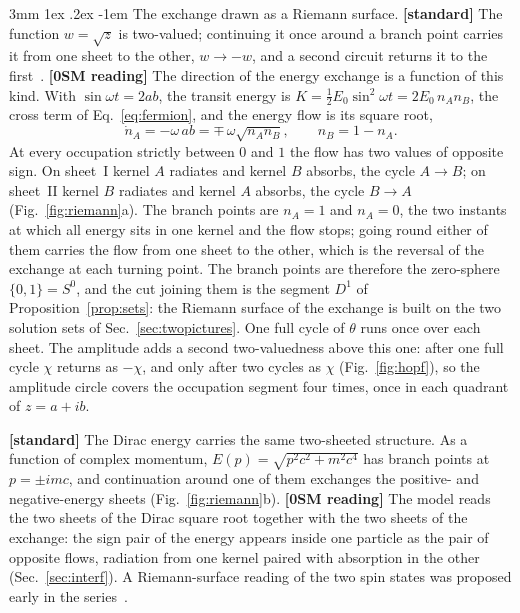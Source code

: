 \documentclass[%
 reprint, amsmath,amssymb, aps, prb, ]{revtex4-2}
\makeatletter
\numberwithin{equation}{section}
\renewcommand\paragraph{%
  \@startsection{paragraph}{4}{\z@}%
    {3mm \@plus 1ex \@minus .2ex}%
    {-1em}%
    {\normalfont\normalsize\itshape}}
\makeatother
\begin{document}
\paragraph{The exchange drawn as a Riemann surface.} \textbf{[standard]} The function $w=\sqrt{z}$ is two-valued; continuing it once around a branch point carries it from one sheet to the other, $w\to-w$, and a second circuit returns it to the first~\cite{ref:needham}. \textbf{[0SM reading]} The direction of the energy exchange is a function of this kind. With $\sin\omega t=2ab$, the transit energy is $K=\tfrac12E_0\sin^2\omega t=2E_0\,n_An_B$, the cross term of Eq.~\eqref{eq:fermion}, and the energy flow is its square root,
\begin{equation}
\dot n_A=-\omega\,ab=\mp\,\omega\sqrt{n_An_B},\qquad n_B=1-n_A .
\label{eq:flowroot}
\end{equation}
At every occupation strictly between $0$ and $1$ the flow has two values of opposite sign. On sheet~I kernel $A$ radiates and kernel $B$ absorbs, the cycle $A\to B$; on sheet~II kernel $B$ radiates and kernel $A$ absorbs, the cycle $B\to A$ (Fig.~\ref{fig:riemann}a). The branch points are $n_A=1$ and $n_A=0$, the two instants at which all energy sits in one kernel and the flow stops; going round either of them carries the flow from one sheet to the other, which is the reversal of the exchange at each turning point. The branch points are therefore the zero-sphere $\{0,1\}=S^0$, and the cut joining them is the segment $D^1$ of Proposition~\ref{prop:sets}: the Riemann surface of the exchange is built on the two solution sets of Sec.~\ref{sec:twopictures}. One full cycle of $\theta$ runs once over each sheet. The amplitude adds a second two-valuedness above this one: after one full cycle $\chi$ returns as $-\chi$, and only after two cycles as $\chi$ (Fig.~\ref{fig:hopf}), so the amplitude circle covers the occupation segment four times, once in each quadrant of $z=a+ib$.

\textbf{[standard]} The Dirac energy carries the same two-sheeted structure. As a function of complex momentum, $E(p)=\sqrt{p^2c^2+m^2c^4}$ has branch points at $p=\pm imc$, and continuation around one of them exchanges the positive- and negative-energy sheets (Fig.~\ref{fig:riemann}b). \textbf{[0SM reading]} The model reads the two sheets of the Dirac square root together with the two sheets of the exchange: the sign pair of the energy appears inside one particle as the pair of opposite flows, radiation from one kernel paired with absorption in the other (Sec.~\ref{sec:interf}). A Riemann-surface reading of the two spin states was proposed early in the series~\cite{ref:p3}.
\end{document}
